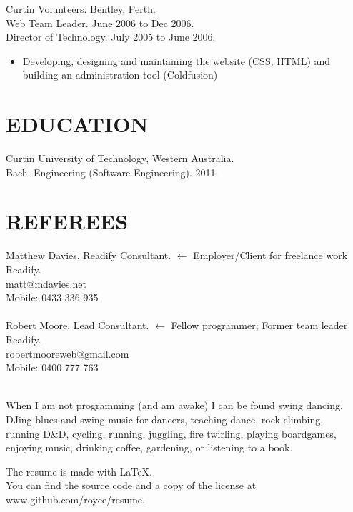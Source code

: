 \documentclass[margin]{res}
\begin{document}
\begin{resume}
  Curtin Volunteers. Bentley, Perth. \\
  Web Team Leader.  June 2006 to Dec 2006.\\
  Director of Technology.  July 2005 to June 2006.
  \begin{itemize}
    \item Developing, designing and maintaining the website (CSS, HTML) and building an administration tool (Coldfusion)
  \end{itemize} 

  \section{EDUCATION}
  Curtin University of Technology, Western Australia. \\
  Bach. Engineering (Software Engineering). 2011.

  \section{REFEREES}
  Matthew Davies, Readify Consultant.
  \hfill $\longleftarrow$ Employer/Client for freelance work\\
  Readify. \\
  matt@mdavies.net  \\
  Mobile: 0433 336 935 \\
  \\
  Robert Moore, Lead Consultant.
  \hfill $\longleftarrow$ Fellow programmer; Former team leader\\
  Readify. \\
  robertmooreweb@gmail.com \\
  Mobile: 0400 777 763 \\
  \\

\end{resume} 

\vfill
\centering

\hspace{-1.75in}  When I am not programming (and am awake) I can be found swing dancing, \\
\hspace{-1.75in}  DJing blues and swing music for dancers, teaching dance, rock-climbing,\\
\hspace{-1.75in}  running D\&D, cycling, running, juggling, fire twirling, playing boardgames,\\
\hspace{-1.75in}  enjoying music, drinking coffee, gardening, or listening to a book.

\vfill
\hspace{-1.75in}  The resume is made with \LaTeX. \\
\hspace{-1.75in}  You can find the source code and a copy of the license
                  at www.github.com/royce/resume.
\end{document}
